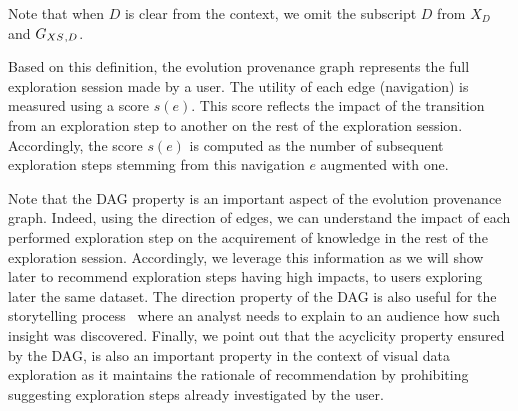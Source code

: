 Note that when $D$ is clear from the context, we omit the subscript $D$ from $X_D$ and $G_{XS}{}_{,D}$.

Based on this definition, the evolution provenance graph represents the full exploration session made by a user. 
The utility of each edge (navigation) is measured using a score $s(e)$.
This score reflects the impact of the transition from an exploration step to another on the rest of the exploration session. 
Accordingly, the score $s(e)$ is computed as the number of subsequent exploration steps stemming from this navigation $e$ augmented with one.


Note that the DAG property is an important aspect of the evolution provenance graph. Indeed, using the direction of edges, we can understand the impact of each performed exploration step on the acquirement of knowledge in the rest of the exploration session. Accordingly, we leverage this information as we will show later to recommend exploration steps having high impacts, to users exploring later the same dataset.
 The direction property of the DAG is also useful for the storytelling process~\cite{2016_eurovis_clue} where an analyst needs to explain to an audience how such insight was discovered.
Finally, we point out that the acyclicity property ensured by the DAG, is also an important property in the context of visual data exploration as it maintains the rationale of recommendation by prohibiting suggesting exploration steps already investigated by the user.

		
	

